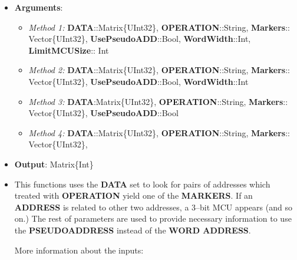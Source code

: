  \begin{itemize}
 	\item \textbf{Arguments}: 
 		\begin{itemize}
 			\item \textit{Method 1: } \textbf{DATA}::Matrix\{UInt32\}, 
 			\textbf{OPERATION}::String,
 			\textbf{Markers}:: Vector\{UInt32\}, 
 			\textbf{UsePseudoADD}::Bool, 
 			\textbf{WordWidth}::Int,
 			\textbf{LimitMCUSize}:: Int
 			\item \textit{Method 2: } \textbf{DATA}::Matrix\{UInt32\}, 
 			\textbf{OPERATION}::String,
 			\textbf{Markers}:: Vector\{UInt32\}, 
 			\textbf{UsePseudoADD}::Bool, 
 			\textbf{WordWidth}::Int
 			\item \textit{Method 3: } \textbf{DATA}:Matrix\{UInt32\}, 
 			\textbf{OPERATION}::String,
 			\textbf{Markers}:: Vector\{UInt32\}, 
 			\textbf{UsePseudoADD}::Bool
 			\item \textit{Method 4: } \textbf{DATA}::Matrix\{UInt32\}, 
 			\textbf{OPERATION}::String,
 			\textbf{Markers}:: Vector\{UInt32\}, 
 		\end{itemize}
 	\item \textbf{Output}: Matrix\{Int\}
 	\item This functions uses the \textbf{DATA} set to look for pairs of addresses which treated with 	 \textbf{OPERATION} yield one of the \textbf{MARKERS}. If an \textbf{ADDRESS} is related to other two addresses, 	 a 3--bit MCU appears (and so on.) The rest of parameters are used to provide necessary  information to use the \textbf{PSEUDOADDRESS} instead of the \textbf{WORD ADDRESS}. 
	 
	 More information about the inputs:
	 

\end{itemize}
